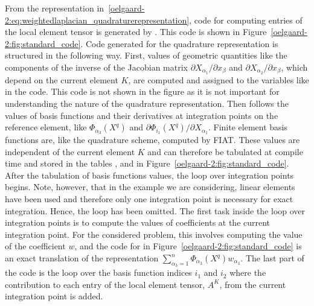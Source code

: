 From the representation
in~\eqref{oelgaard-2:eq:weightedlaplacian_quadraturerepresentation},
code for computing entries of the local element tensor is generated
by \ffc{}. This code is shown in
Figure~\ref{oelgaard-2:fig:standard_code}.
Code generated for the quadrature representation is structured in the following
way.
First, values of geometric quantities like the components of the inverse of the
Jacobian matrix
$\partial X_{\alpha_1} / \partial x_{\beta}$ and
$\partial X_{\alpha_2} / \partial x_{\beta}$,
which depend on the current element $K$, are computed and assigned to the
variables like  in the code.
This code is not shown in the figure as it is not important for
understanding the nature of the quadrature representation.
Then follows the values of basis functions and their derivatives at integration
points on the reference element, like $\Phi_{\alpha_{3}}(X^q)$ and
$\partial \Phi_{i_1}(X^q) / \partial X_{\alpha_1}$.
Finite element basis functions are, like the quadrature scheme, computed by
FIAT.
These values are independent of the current element $K$ and can therefore be
tabulated at compile time and stored in the tables ,
 and  in
Figure~\ref{oelgaard-2:fig:standard_code}.
After the tabulation of basis functions values, the loop over integration points
begins.
Note, however, that in the example we are considering, linear elements
have been used and therefore only
one integration point is necessary for exact integration. Hence, the loop has
been omitted.
The first task inside the loop over integration points is to
compute the values of coefficients at the current integration point.
For the considered problem, this involves computing the value of the
coefficient $w$, and the code for  in
Figure~\ref{oelgaard-2:fig:standard_code}
is an exact translation of the representation
$\sum_{\alpha_{3}=1}^n \Phi_{\alpha_{3}}(X^q) w_{\alpha_{3}}$.
The last part of the code is the loop over the basis function indices $i_{1}$ and
$i_{2}$ where the contribution to each entry of the local element tensor,
$A^{K}$, from the current integration point is added.
%
